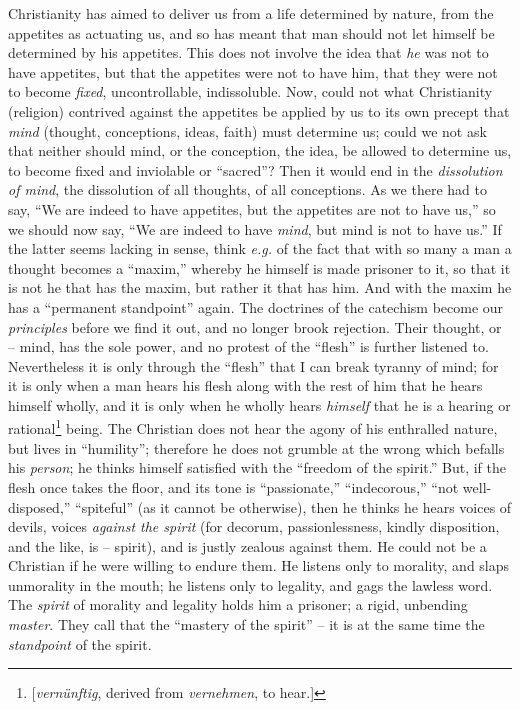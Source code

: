\documentclass[12pt,a4paper]{book}
\begin{document}
Christianity has aimed to deliver us from a life determined by nature, from 
the appetites as actuating us, and so has meant that man should not let 
himself be determined by his appetites. This does not involve the idea that 
\textit{he} was not to have appetites, but that the appetites were not to have 
him, that they were not to become \textit{fixed}, uncontrollable, 
indissoluble. Now, could not what Christianity (religion) contrived against 
the appetites be applied by us to its own precept that \textit{mind} (thought, 
conceptions, ideas, faith) must determine us; could we not ask that neither 
should mind, or the conception, the idea, be allowed to determine us, to 
become fixed and inviolable or ``sacred''? Then it would end in the 
\textit{dissolution of mind}, the dissolution of all thoughts, of all 
conceptions. As we there had to say, ``We are indeed to have appetites, but 
the appetites are not to have us,'' so we should now say, ``We are indeed to 
have \textit{mind}, but mind is not to have us.'' If the latter seems lacking 
in sense, think \textit{e.g.} of the fact that with so many a man a thought 
becomes a ``maxim,'' whereby he himself is made prisoner to it, so that it 
is not he that has the maxim, but rather it that has him. And with the maxim 
he has a ``permanent standpoint'' again. The doctrines of the catechism 
become our \textit{principles} before we find it out, and no longer brook 
rejection. Their thought, or -- mind, has the sole power, and no protest of 
the ``flesh'' is further listened to. Nevertheless it is only through the 
``flesh'' that I can break tyranny of mind; for it is only when a man hears 
his flesh along with the rest of him that he hears himself wholly, and it is 
only when he wholly hears \textit{himself} that he is a hearing or 
rational\footnote{[\textit{vern\"unftig}, derived from \textit{vernehmen}, to 
hear.]} being. The Christian does not hear the agony of his enthralled nature, 
but lives in ``humility''; therefore he does not grumble at the wrong which 
befalls his \textit{person}; he thinks himself satisfied with the ``freedom 
of the spirit.'' But, if the flesh once takes the floor, and its tone is 
``passionate,'' ``indecorous,'' ``not well-disposed,'' ``spiteful'' 
(as it cannot be otherwise), then he thinks he hears voices of devils, voices 
\textit{against the spirit} (for decorum, passionlessness, kindly disposition, 
and the like, is -- spirit), and is justly zealous against them. He could not 
be a Christian if he were willing to endure them. He listens only to morality, 
and slaps unmorality in the mouth; he listens only to legality, and gags the 
lawless word. The \textit{spirit} of morality and legality holds him a 
prisoner; a rigid, unbending \textit{master}. They call that the ``mastery of 
the spirit'' -- it is at the same time the \textit{standpoint} of the spirit.
\end{document}
